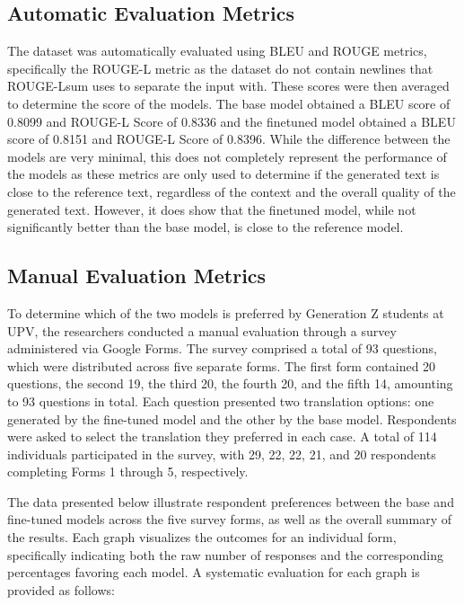 \subsection{Automatic Evaluation Metrics}
The dataset was automatically evaluated using BLEU and ROUGE metrics, specifically the ROUGE-L metric as the dataset do not contain newlines that ROUGE-Lsum uses to separate the input with. These scores were then averaged to determine the score of the models. The base model obtained a BLEU score of 0.8099 and ROUGE-L Score of 0.8336 and the finetuned model obtained a BLEU score of 0.8151 and ROUGE-L Score of 0.8396. While the difference between the models are very minimal, this does not completely represent the performance of the models as these metrics are only used to determine if the generated text is close to the reference text, regardless of the context and the overall quality of the generated text. However, it does show that the finetuned model, while not significantly better than the base model, is close to the reference model.

\subsection{Manual Evaluation Metrics}
To determine which of the two models is preferred by Generation Z students at UPV, the researchers conducted a manual evaluation through a survey administered via Google Forms. The survey comprised a total of 93 questions, which were distributed across five separate forms. The first form contained 20 questions, the second 19, the third 20, the fourth 20, and the fifth 14, amounting to 93 questions in total. Each question presented two translation options: one generated by the fine-tuned model and the other by the base model. Respondents were asked to select the translation they preferred in each case. A total of 114 individuals participated in the survey, with 29, 22, 22, 21, and 20 respondents completing Forms 1 through 5, respectively. 

The data presented below illustrate respondent preferences between the base and fine-tuned models across the five survey forms, as well as the overall summary of the results. Each graph visualizes the outcomes for an individual form, specifically indicating both the raw number of responses and the corresponding percentages favoring each model. A systematic evaluation for each graph is provided as follows:

